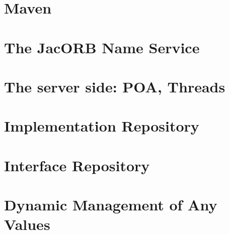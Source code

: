 \documentclass[12pt]{scrbook}
\begin{document}



\chapter{Maven}
\label{ch:mvn}




\chapter{The JacORB Name Service}
\label{ch:naming}




\chapter{The server side: POA, Threads}
\label{ch:POA}




\chapter{Implementation Repository}
\label{Ch_Imr}



\chapter{Interface Repository}
\label{ch:interface_repository}




\chapter{Dynamic Management of Any Values}
\label{ch:dynany}
\end{document}

